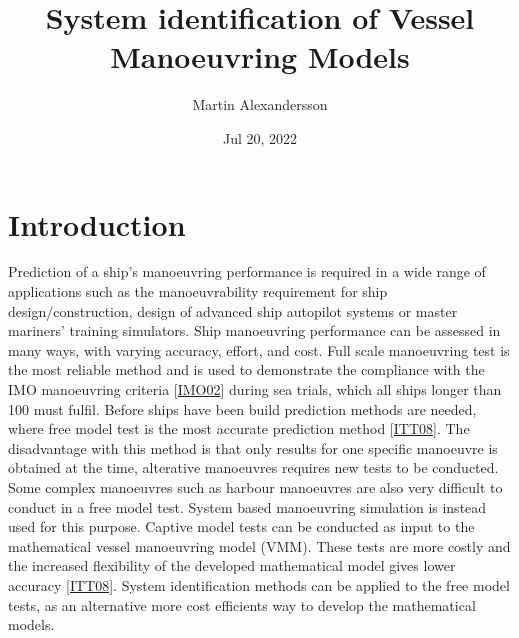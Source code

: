 \documentclass[review]{elsarticle}
\title{System identification of Vessel Manoeuvring Models}
\date{Jul 20, 2022}
\author{Martin Alexandersson}
\begin{document}



\pagestyle{empty}

\pagestyle{plain}

\pagestyle{normal}
\label{\detokenize{index::doc}}



\section{Introduction}
\label{\detokenize{00.02_introduction:introduction}}\label{\detokenize{00.02_introduction::doc}}
\sphinxAtStartPar
Prediction of a ship’s manoeuvring performance is required in a wide range of applications such as the manoeuvrability requirement for ship design/construction, design of advanced ship autopilot systems or master mariners’ training simulators. Ship manoeuvring performance can be assessed in many ways, with varying accuracy, effort, and cost. Full scale manoeuvring test is the most reliable method and is used to demonstrate the compliance with the IMO manoeuvring criteria {[}\hyperlink{cite.bibligraphy:id16}{IMO02}{]} during sea trials, which all ships longer than 100 must fulfil. Before ships have been build prediction methods are needed, where free model test is the most accurate prediction method {[}\hyperlink{cite.bibligraphy:id75}{ITT08}{]}. The disadvantage with this method is that only results for one specific manoeuvre is obtained at the time, alterative manoeuvres requires new tests to be conducted. Some complex manoeuvres such as harbour manoeuvres are also very difficult to conduct in a free model test.
System based manoeuvring simulation is instead used for this purpose. Captive model tests can be conducted as input to the mathematical vessel manoeuvring model (VMM). These tests are more costly and the increased flexibility of the developed mathematical model gives lower accuracy {[}\hyperlink{cite.bibligraphy:id75}{ITT08}{]}. System identification methods can be applied to the free model tests, as an alternative more cost efficients way to develop the mathematical models.
\end{document}
